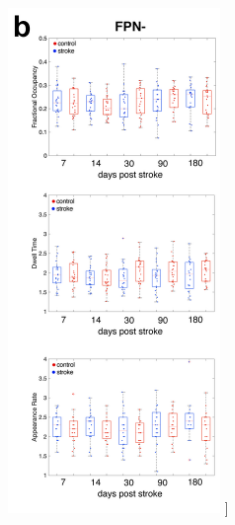 \documentclass[phd,tocprelim]{cornell}
\renewcommand{\caption}[1]{\singlespacing\hangcaption{#1}\normalspacing}
\begin{document}
\begin{figure}[h!]
		\ContinuedFloat
		\captionsetup{labelformat=adja-page}
    \centering
    \includegraphics[width=0.5\textwidth]{chapter2/SupplementaryFig8b.png}
    \caption[]{}
\end{figure}
\null
\vfill
\clearpage
\null
\vfill
\end{document}
